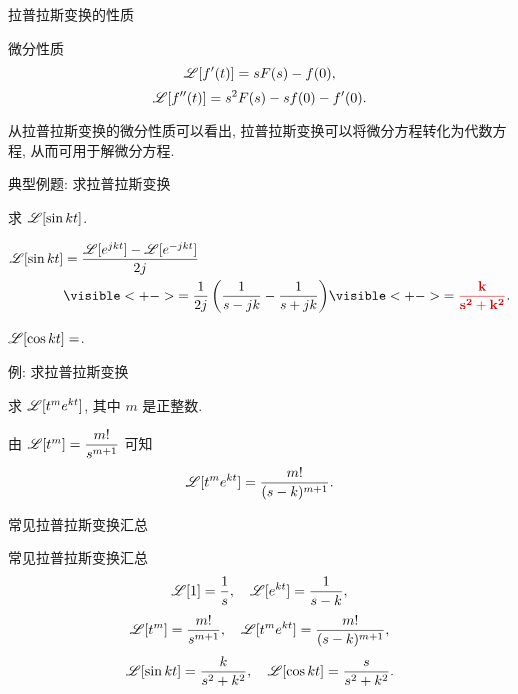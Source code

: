 \begin{frame}{拉普拉斯变换的性质}
	\onslide<+->
	\begin{second}{微分性质}
		\[\mathscr{L}[f'(t)]=sF(s)-f(0),\]
		\[\mathscr{L}[f''(t)]=s^2F(s)-sf(0)-f'(0).\]
	\end{second}

	\onslide<+->
	从拉普拉斯变换的微分性质可以看出, 拉普拉斯变换可以将微分方程转化为代数方程, 从而可用于解微分方程.
\end{frame}


\begin{frame}{典型例题: 求拉普拉斯变换}
	\onslide<+->
	\begin{example}
		求 $\mathscr{L}[\sin{kt}]$.
	\end{example}

	\onslide<+->
	\begin{solution}
		\begin{align*}
			\msl[\sin{kt}]&=\frac{\msl[e^{jkt}]-\msl[e^{-jkt}]}{2j}\\
			&\visible<+->{=\frac1{2j}\left(\frac1{s-jk}-\frac1{s+jk}\right)}
			\visible<+->{=\alert{\frac k{s^2+k^2}}.}
		\end{align*}
	\end{solution}

	\onslide<+->
	\begin{exercise}
		$\mathscr{L}[\cos{kt}]=$.
	\end{exercise}
\end{frame}


\begin{frame}{例: 求拉普拉斯变换}
	\onslide<+->
	\begin{example}
		求 $\mathscr{L}[t^me^{kt}]$, 其中 $m$ 是正整数.
	\end{example}

	\onslide<+->
	\begin{solution}
		由 $\mathscr{L}[t^m]=\dfrac{m!}{s^{m+1}}$ 可知
		\[\mathscr{L}[t^me^{kt}]=\frac{m!}{(s-k)^{m+1}}.\]
	\end{solution}
\end{frame}


\begin{frame}{常见拉普拉斯变换汇总}
	\onslide<+->
	\begin{second}{常见拉普拉斯变换汇总}
		\[\mathscr{L}[1]=\frac1s,\quad \mathscr{L}[e^{kt}]=\frac1{s-k},\]
		\[\mathscr{L}[t^m]=\frac{m!}{s^{m+1}},\quad \mathscr{L}[t^me^{kt}]=\frac{m!}{(s-k)^{m+1}},\]
		\[\mathscr{L}[\sin kt]=\frac{k}{s^2+k^2},\quad
		\mathscr{L}[\cos kt]=\frac{s}{s^2+k^2}.\]
	\end{second}
\end{frame}


